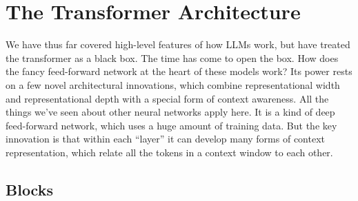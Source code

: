 \section{The Transformer Architecture}\label{transformers}

We have thus far covered high-level features of how LLMs work, but have treated the transformer as a black box. The time has come to open the box. How does the fancy feed-forward network at the heart of these models work? Its power rests on a few novel architectural innovations, which combine representational width and representational depth with a special form of context awareness. All the things we've seen about other neural networks apply here. It is a kind of deep feed-forward network, which uses a huge amount of training data. But the key innovation is that within each ``layer'' it can develop many forms of context representation, which relate all the tokens in a context window to each other.

\subsection{Blocks}



